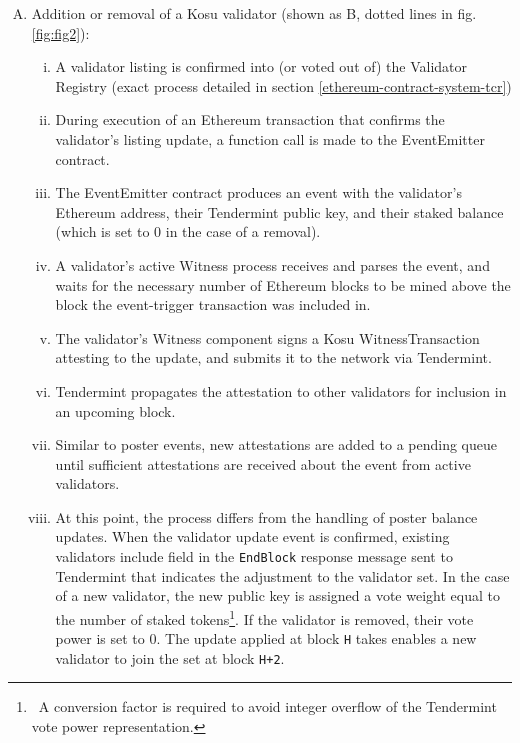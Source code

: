 \documentclass[10pt]{article}
\begin{document}
\begin{enumerate}[A.]
  \item Addition or removal of a Kosu validator (shown as B, dotted lines in fig. \ref{fig:fig2}):
  \begin{enumerate}[i.]
    \item A validator listing is confirmed into (or voted out of) the Validator Registry (exact process detailed in section \ref{ethereum-contract-system-tcr})
    \item During execution of an Ethereum transaction that confirms the validator’s listing update, a function call is made to the EventEmitter contract.
    \item The EventEmitter contract produces an event with the validator’s Ethereum address, their Tendermint public key, and their staked balance (which is set to 0 in the case of a removal).
    \item A validator’s active Witness process receives and parses the event, and waits for the necessary number of Ethereum blocks to be mined above the block the event-trigger transaction was included in.
    \item The validator’s Witness component signs a Kosu WitnessTransaction attesting to the update, and submits it to the network via Tendermint.
    \item Tendermint propagates the attestation to other validators for inclusion in an upcoming block. 
    \item Similar to poster events, new attestations are added to a pending queue until sufficient attestations are received about the event from active validators.
    \item At this point, the process differs from the handling of poster balance updates. When the validator update event is confirmed, existing validators include field in the \texttt{EndBlock} response message sent to Tendermint that indicates the adjustment to the validator set. In the case of a new validator, the new public key is assigned a vote weight equal to the number of staked tokens\footnote{\ A conversion factor is required to avoid integer overflow of the Tendermint vote power representation.}. If the validator is removed, their vote power is set to 0. The update applied at block \texttt{H} takes enables a new validator to join the set at block \texttt{H+2}\cite{tendermint-abci-spec}.
  \end{enumerate} 
\end{enumerate}
\end{document}
